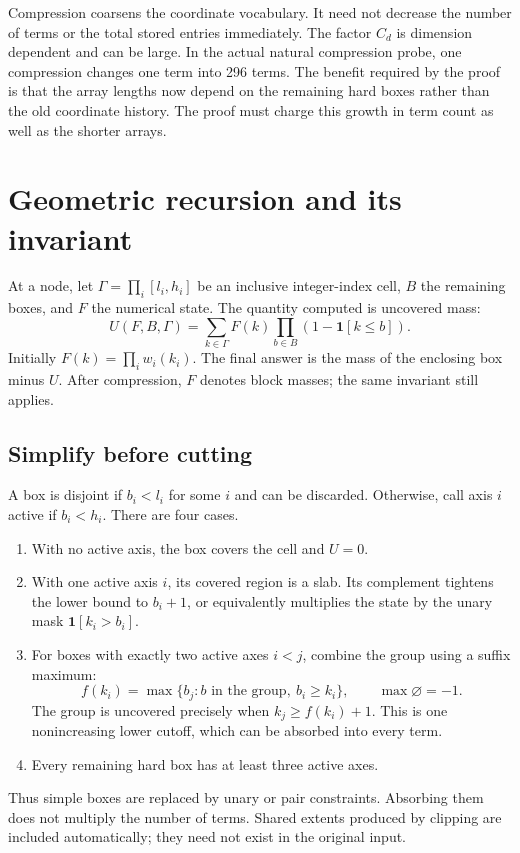 \documentclass[12pt,a4paper]{article}
\theoremstyle{definition}
\newcommand{\ind}{\mathbf 1}
\begin{document}
Compression coarsens the coordinate vocabulary. It need not decrease
the number of terms or the total stored entries immediately. The factor
$C_d$ is dimension dependent and can be large. In the actual natural
compression probe, one compression changes one term into 296 terms.
The benefit required by the proof is that the array lengths now depend
on the remaining hard boxes rather than the old coordinate history.
The proof must charge this growth in term count as well as the shorter
arrays.

\section{Geometric recursion and its invariant}
\label{sec:geometry}

At a node, let $\Gamma=\prod_i[l_i,h_i]$ be an inclusive integer-index
cell, $B$ the remaining boxes, and $F$ the numerical state. The quantity
computed is uncovered mass:
\begin{equation}
 U(F,B,\Gamma)=\sum_{k\in\Gamma}F(k)
                          \prod_{b\in B}(1-\ind[k\le b]).
 \label{eq:invariant}
\end{equation}
Initially $F(k)=\prod_iw_i(k_i)$. The final answer is the mass of the
enclosing box minus $U$. After compression, $F$ denotes block masses;
the same invariant still applies.

\subsection{Simplify before cutting}
A box is disjoint if $b_i<l_i$ for some $i$ and can be discarded.
Otherwise, call axis $i$ active if $b_i<h_i$. There are four cases.
\begin{enumerate}
\item With no active axis, the box covers the cell and $U=0$.
\item With one active axis $i$, its covered region is a slab. Its
complement tightens the lower bound to $b_i+1$, or equivalently multiplies
the state by the unary mask $\ind[k_i>b_i]$.
\item For boxes with exactly two active axes $i<j$, combine the group
using a suffix maximum:
\[
 f(k_i)=\max\{b_j:b\text{ in the group},\ b_i\ge k_i\},
 \qquad\max\varnothing=-1.
\]
The group is uncovered precisely when $k_j\ge f(k_i)+1$. This is one
nonincreasing lower cutoff, which can be absorbed into every term.
\item Every remaining hard box has at least three active axes.
\end{enumerate}
Thus simple boxes are replaced by unary or pair constraints. Absorbing
them does not multiply the number of terms. Shared extents produced by
clipping are included automatically; they need not exist in the original
input.
\end{document}
